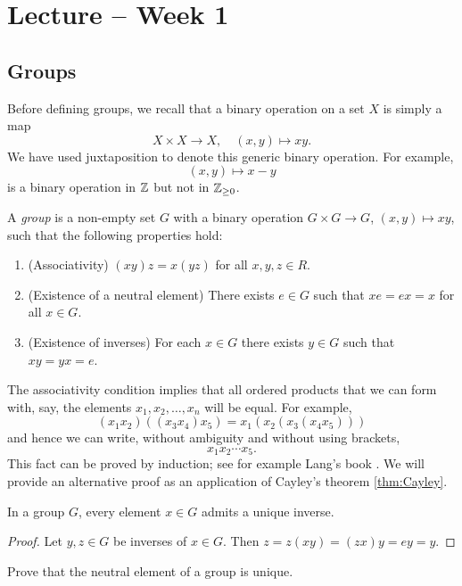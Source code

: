 \section{Lecture -- Week 1} 

\subsection{Groups}

Before defining groups, we recall that a binary operation on a set $X$
is simply a map 
\[
X\times X\to X,
\quad (x,y)\mapsto xy.
\]
We have used 
juxtaposition to denote this generic binary operation. For example,
\[
(x,y)\mapsto x-y
\]
is a binary operation in $\mathbb{Z}$ but not
in $\mathbb{Z}_{\geq 0}$.

\begin{definition}
A \emph{group} is a non-empty set $G$ with a binary operation
$G\times G\to G$, $(x,y)\mapsto xy$, such that
the following properties hold:
\begin{enumerate}
    \item (Associativity) $(xy)z=x(yz)$ for all $x,y,z\in R$.
    \item (Existence of a neutral element) There exists $e\in G$ such that $xe=ex=x$ for all $x\in G$.
    \item (Existence of inverses) For each $x\in G$ there exists $y\in G$ such that $xy=yx=e$.
\end{enumerate}
\end{definition}

The associativity condition implies
that all ordered products that we can form with, say, 
the elements $x_1,x_2,\dots,x_n$ will be equal. For example,
\[
(x_1x_2)((x_3x_4)x_5)=x_1(x_2(x_3(x_4x_5)))
\]
and hence we can write, without ambiguity and without using brackets, 
\[
x_1x_2\cdots x_5.
\]
This fact can be proved by induction; see for example
Lang's book \cite{MR783636}. We will provide an alternative proof as an application
of Cayley's theorem \ref{thm:Cayley}. 

\begin{proposition}
    In a group $G$, every element $x\in G$ admits a unique inverse.
\end{proposition}

\begin{proof}
    Let $y,z\in G$ be inverses of $x\in G$. Then 
    $z=z(xy)=(zx)y=ey=y$.
\end{proof}

\begin{exercise}
\label{xca:neutral}
    Prove that the neutral element of a group is unique. 
\end{exercise}

